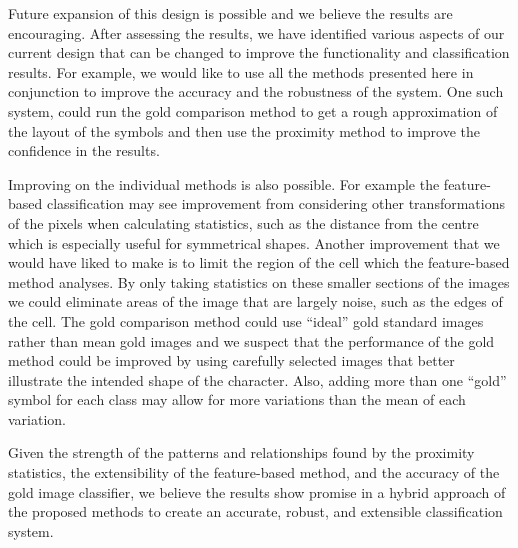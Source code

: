
Future expansion of this design is possible and we believe the results are
encouraging.  After assessing the results, we have identified various aspects
of our current design that can be changed to improve the functionality and
classification results. For example, we would like to use all the methods
presented here in conjunction to improve the accuracy and the robustness of the
system.  One such system, could run the gold comparison method to get a rough
approximation of the layout of the symbols and then use the proximity method to
improve the confidence in the results. 

Improving on the individual methods is also possible. For example the
feature-based classification may see improvement from considering other
transformations of the pixels when calculating statistics, such as the distance
from the centre which is especially useful for symmetrical shapes.  Another
improvement that we would have liked to make is to limit the region of the cell
which the feature-based method analyses.  By only taking statistics on these
smaller sections of the images we could eliminate areas of the image that are
largely noise, such as the edges of the cell.  The gold comparison method could
use ``ideal'' gold standard images rather than mean gold images and we suspect
that the performance of the gold method could be improved by using carefully
selected images that better illustrate the intended shape of the character.
Also, adding more than one ``gold'' symbol for each class may allow for more
variations than the mean of each variation.

Given the strength of the patterns and relationships found by the proximity
statistics, the extensibility of the feature-based method, and the accuracy of
the gold image classifier, we believe the results show promise in a hybrid
approach of the proposed methods to create an accurate, robust, and extensible
classification system.

